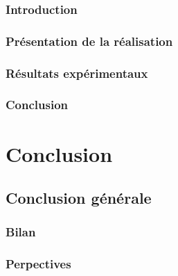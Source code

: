 \documentclass[french]{spimutbmphdthesis}
\begin{document}
\section{Introduction}

\section{Présentation de la réalisation}

\section{Résultats expérimentaux}

\section{Conclusion}

\part{Conclusion}

\chapter{Conclusion générale}
 
\section{Bilan}

\section{Perpectives}
 
\backmatter
 
 
 
 
 
 
\end{document}
